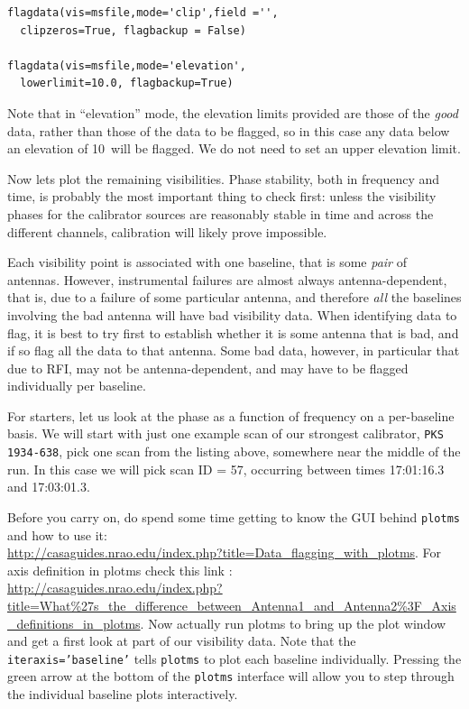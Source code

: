 \documentclass[force,almostfull,justified]{tufte-book}
\begin{document}
\begin{casacmd}
\begin{verbatim}
flagdata(vis=msfile,mode='clip',field ='',
  clipzeros=True, flagbackup = False)

flagdata(vis=msfile,mode='elevation',
  lowerlimit=10.0, flagbackup=True) 
\end{verbatim}
Note that in ``elevation'' mode, the elevation limits provided are those of the {\em good} data,
rather than those of the data to be flagged, so in this case any data below an elevation of 10\arcdeg\
will be flagged.  We do not need to set an upper elevation limit.
\end{casacmd}

Now lets plot the remaining visibilities.  Phase stability, both in frequency and time, is probably
the most important thing to check first: unless the visibility phases for the calibrator sources are
reasonably stable in time and across the different channels, calibration will likely prove impossible.

Each visibility point is associated with one baseline, that is some {\em pair} of antennas.  However,
instrumental failures are almost always antenna-dependent, that is, due to a failure of some
particular antenna, and therefore {\em all} the baselines involving the bad antenna will have bad
visibility data.  When identifying data to flag, it is best to try first to establish whether it is
some antenna that is bad, and if so flag all the data to that antenna.  Some bad data, however, in
particular that due to RFI, may not be antenna-dependent, and may have to be flagged individually per
baseline.

For starters, let us look at the phase as a function of frequency on a per-baseline basis.  We will
start with just one example scan of our strongest calibrator, {\tt PKS 1934-638}, pick one scan from
the listing above, somewhere near the middle of the run.  In this case we will pick scan ID = 57,
occurring between times 17:01:16.3 and 17:03:01.3.

Before you carry on, do spend some time getting to know the GUI behind
{\tt plotms} and how to use it: \\
\mbox{\url{http://casaguides.nrao.edu/index.php?title=Data_flagging_with_plotms}}.
For axis definition in plotms check this link : \\
\url{http://casaguides.nrao.edu/index.php?title=What\%27s_the_difference_between_Antenna1_and_Antenna2\%3F_Axis_definitions_in_plotms}.
Now actually run plotms to bring up the plot window and get a first look at part of our visibility
data.  Note that the {\tt iteraxis='baseline'} tells {\tt plotms} to plot each baseline individually.
Pressing the green arrow at the bottom of the {\tt plotms} interface will allow you to step through
the individual baseline plots interactively.
\end{document}
